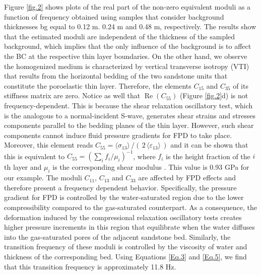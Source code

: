 \documentclass[draft]{agujournal2019}
\renewcommand{\Re}{\operatorname{Re} }
\begin{document}
Figure \ref{fig.2} shows plots of the real part of the non-zero equivalent moduli as a function of frequency obtained using samples that consider background thicknesses bg equal to 0.12 m. 0.24 m and 0.48 m, respectively. The results show that the estimated moduli are independent of the thickness of the sampled background, which implies that the only influence of the background is to affect the BC at the respective thin layer boundaries. 
On the other hand, we observe the homogenized medium is
characterized by vertical transverse isotropy (VTI) that results from the horizontal bedding of the two sandstone units that constitute the poroelastic thin layer. Therefore, the elements $C_{15}$ and $C_{35}$ of its stiffness matrix are zero. Notice as well that $\Re(C_{55})$  (Figure \ref{fig.2}d) is not frequency-dependent. This is because the shear relaxation oscillatory test, which is the analogous to a normal-incident S-wave, generates shear strains and stresses components  parallel to the bedding planes of the thin layer. However, such shear components cannot induce fluid pressure gradients for FPD to take place. Moreover, this element reads $C_{55} = \langle \sigma_{13}\rangle\,/(\,2\, \langle \varepsilon_{13} \rangle\,)$ and it can be shown that this is equivalent to $C_{55}  =\left( \sum_i f_i/\mu_i \right)^{-1}$, where $f_i$ is the height fraction of the $i$th layer and $\mu_i$ is the corresponding shear modulus \cite{Backus1962, Salamon1968}. This value is 0.93 GPa for our example. The moduli  $C_{11}$, $C_{13}$ and $C_{33}$ are affected by FPD effects and therefore present a frequency dependent behavior. Specifically, the pressure gradient for FPD is controlled by the water-saturated region due to the lower compressibility compared to the gas-saturated counterpart. As a consequence, the deformation induced by the compressional relaxation oscillatory tests creates higher pressure increments in this region that equilibrate when the water diffuses into the gas-saturated pores of the adjacent sandstone bed. Similarly, the transition frequency of these moduli is controlled by the viscosity of water and thickness of the corresponding bed. Using Equations \eqref{Eq.3} and \eqref{Eq.5}, we find that this transition frequency is approximately 11.8 Hz. 
\end{document}
